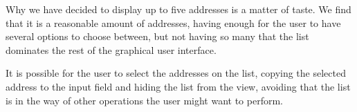 Why we have decided to display up to five addresses is a matter of taste. We find that it is a reasonable amount of addresses, having enough for the user to have several options to choose between, but not having so many that the list dominates the rest of the graphical user interface.

It is possible for the user to select the addresses on the list, copying the selected address to the input field and hiding the list from the view, avoiding that the list is in the way of other operations the user might want to perform.